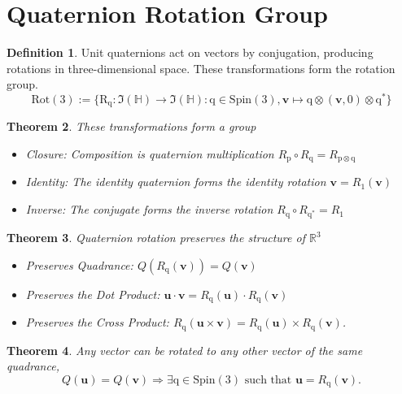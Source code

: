 \documentclass{amsart}
\newtheorem{theorem}{Theorem}[section]
\theoremstyle{definition}
\newtheorem{definition}[theorem]{Definition}
\theoremstyle{remark}
\numberwithin{equation}{section}
\begin{document}
\section{Quaternion Rotation Group}
\begin{definition}
  Unit quaternions act on vectors by conjugation, producing rotations in three-dimensional space.
  These transformations form the rotation group.
  \begin{equation}
    \mathrm{Rot}(3) := \{\mathrm{R}_{\mathrm{q}}:\Im(\mathbb{H})\to\Im(\mathbb{H}) : \mathrm{q}\in\mathrm{Spin}(3), \mathbf{v} \mapsto \mathrm{q}\otimes (\mathbf{v}, 0) \otimes\mathrm{q}^*\}
  \end{equation}
\end{definition}

\begin{theorem}
  These transformations form a group
  \begin{itemize}
    \item Closure: Composition is quaternion multiplication $R_\mathrm{p} \circ R_\mathrm{q} = R_{\mathrm{p}\otimes\mathrm{q}}$
    \item Identity: The identity quaternion forms the identity rotation $\mathbf{v} = R_\mathrm{1}(\mathbf{v})$
    \item Inverse: The conjugate forms the inverse rotation $R_\mathrm{q} \circ R_{\mathrm{q}^*} = R_\mathrm{1}$
  \end{itemize}
\end{theorem}

\begin{theorem}
  Quaternion rotation preserves the structure of $\mathbb{R}^3$
  \begin{itemize}
    \item Preserves Quadrance: $Q(R_\mathrm{q}(\mathbf{v}))=Q(\mathbf{v})$
    \item Preserves the Dot Product: $\mathbf{u} \cdot \mathbf{v}=R_\mathrm{q}(\mathbf{u}) \cdot R_\mathrm{q}(\mathbf{v})$
    \item Preserves the Cross Product: $R_\mathrm{q}\left(\mathbf{u}\times\mathbf{v}\right)=R_\mathrm{q}(\mathbf{u})\times R_\mathrm{q}(\mathbf{v})$.
  \end{itemize}
\end{theorem}

\begin{theorem}
  Any vector can be rotated to any other vector of the same quadrance,
  \begin{equation}
    Q(\mathbf{u})=Q(\mathbf{v}) \Rightarrow \exists \mathrm{q}\in \mathrm{Spin}(3)\text{ such that }\mathbf{u}=R_\mathrm{q}(\mathbf{v}).
  \end{equation}
\end{theorem}
\end{document}

